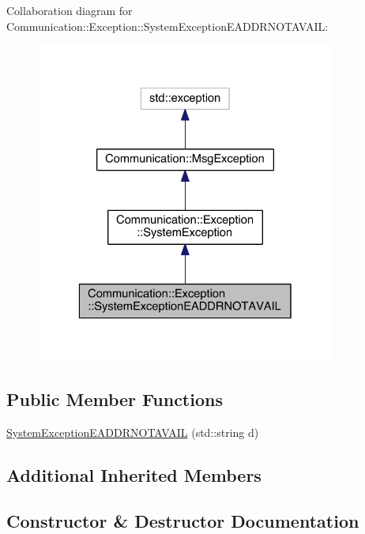 Collaboration diagram for Communication\+:\+:Exception\+:\+:System\+Exception\+E\+A\+D\+D\+R\+N\+O\+T\+A\+V\+A\+I\+L\+:\nopagebreak
\begin{figure}[H]
\begin{center}
\leavevmode
\includegraphics[width=280pt]{class_communication_1_1_exception_1_1_system_exception_e_a_d_d_r_n_o_t_a_v_a_i_l__coll__graph}
\end{center}
\end{figure}
\subsection*{Public Member Functions}
\begin{DoxyCompactItemize}
\item 
\hyperlink{class_communication_1_1_exception_1_1_system_exception_e_a_d_d_r_n_o_t_a_v_a_i_l_a6632bdd82ee646c534c7b4ad0183ff66}{System\+Exception\+E\+A\+D\+D\+R\+N\+O\+T\+A\+V\+A\+I\+L} (std\+::string d)
\end{DoxyCompactItemize}
\subsection*{Additional Inherited Members}


\subsection{Constructor \& Destructor Documentation}
\hypertarget{class_communication_1_1_exception_1_1_system_exception_e_a_d_d_r_n_o_t_a_v_a_i_l_a6632bdd82ee646c534c7b4ad0183ff66}{}
